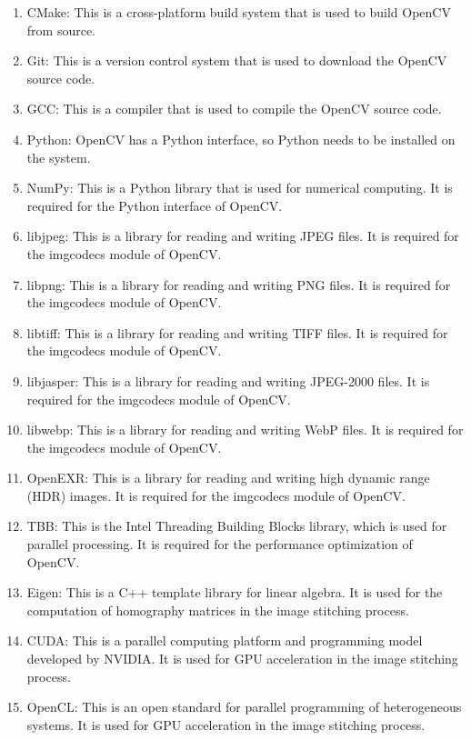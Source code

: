 \begin{enumerate}
    \item CMake: This is a cross-platform build system that is used to build OpenCV from source.
    \item Git: This is a version control system that is used to download the OpenCV source code.
    \item GCC: This is a compiler that is used to compile the OpenCV source code.
    \item Python: OpenCV has a Python interface, so Python needs to be installed on the system.
    \item NumPy: This is a Python library that is used for numerical computing. It is required for the Python interface of OpenCV.
    \item libjpeg: This is a library for reading and writing JPEG files. It is required for the imgcodecs module of OpenCV.
    \item libpng: This is a library for reading and writing PNG files. It is required for the imgcodecs module of OpenCV.
    \item libtiff: This is a library for reading and writing TIFF files. It is required for the imgcodecs module of OpenCV.
    \item libjasper: This is a library for reading and writing JPEG-2000 files. It is required for the imgcodecs module of OpenCV.
    \item libwebp: This is a library for reading and writing WebP files. It is required for the imgcodecs module of OpenCV.
    \item OpenEXR: This is a library for reading and writing high dynamic range (HDR) images. It is required for the imgcodecs module of OpenCV.
    \item TBB: This is the Intel Threading Building Blocks library, which is used for parallel processing. It is required for the performance optimization of OpenCV.
    \item Eigen: This is a C++ template library for linear algebra. It is used for the computation of homography matrices in the image stitching process.
    \item CUDA: This is a parallel computing platform and programming model developed by NVIDIA. It is used for GPU acceleration in the image stitching process.
    \item OpenCL: This is an open standard for parallel programming of heterogeneous systems. It is used for GPU acceleration in the image stitching process.
\end{enumerate}
\pagebreak

